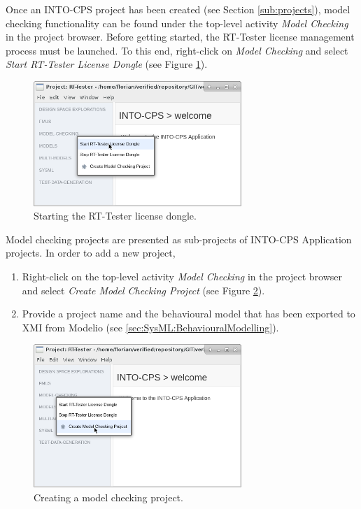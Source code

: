 Once an INTO-CPS project has been created (see Section \ref{sub:projects}),
model checking functionality can be found
under the top-level activity \emph{Model Checking} in the project browser.
%
Before getting started, the RT-Tester license management process must be launched.
%
To this end, right-click on \emph{Model Checking} and select \emph{Start RT-Tester License Dongle}
(see Figure \ref{figure:INTO-CPS-App:MC:Start-License-Dongle}).
%
%
%
\begin{figure}[ht]
    \centerline{\includegraphics[width=0.7\textwidth]{figures/VSI-MC_Start-License-Dongle}}
    \caption{Starting the RT-Tester license dongle.}
    \label{figure:INTO-CPS-App:MC:Start-License-Dongle}
\end{figure}
%
%
%
Model checking projects are presented as sub-projects of INTO-CPS Application projects.
In order to add a new project,
%
%
%
\begin{enumerate}
\item  Right-click on the top-level activity \emph{Model Checking}
in the project browser and select \emph{Create Model Checking Project} (see
Figure \ref{figure:INTO-CPS-App:Create-MC-Project}).
%
\item  Provide a project name and the behavioural model that has been exported to XMI from Modelio (see \cref{sec:SysML:BehaviouralModelling}).
\end{enumerate}
%
%
%
\begin{figure}[ht]
    \centerline{\includegraphics[width=0.7\textwidth]{figures/VSI-MC_Create-MC-Project}}
    \caption{Creating a model checking project.}
    \label{figure:INTO-CPS-App:Create-MC-Project}
\end{figure}
